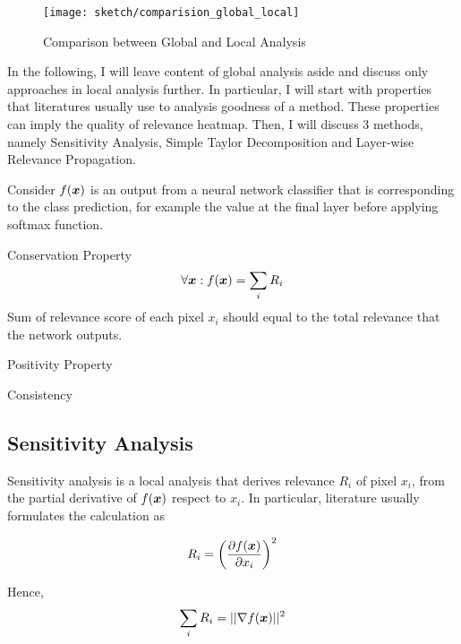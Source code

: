  \begin{figure}[!hbt]
\centering
\texttt{[image: sketch/comparision\_global\_local]}
\caption{Comparison between Global and Local Analysis}
\label{fig:comparision_between_global_and_local_analysis}
\end{figure}

In the following, I will leave content of global analysis aside and discuss  only approaches in local analysis further.  In particular, I will start with properties that literatures usually use to analysis goodness of a method. These properties can imply the quality of relevance heatmap. Then, I will discuss  3 methods, namely Sensitivity Analysis,  Simple Taylor Decomposition and Layer-wise Relevance Propagation.

Consider $f(\patvector{x})$ is an output from a neural network classifier that is corresponding to the class prediction, for example the value at the final layer before applying softmax function.
\begin{definition} Conservation Property
\begin{align*}
	\forall \patvector{x} : f(\patvector{x}) = \sum_i R_i
\end{align*}
Sum of relevance score of each pixel $x_i$ should equal to the total relevance that the network outputs.

\end{definition}
\begin{definition} Positivity Property
\end{definition}
\begin{definition} Consistency
\end{definition}

\subsection{Sensitivity Analysis}
Sensitivity analysis\cite{SimonyanDeepConvolutionalNetworks2013} is a local analysis that derives relevance $R_i$ of pixel $x_i$, from the partial derivative of $f(\patvector{x})$ respect to $x_i$. In particular, literature usually formulates the calculation as 

\begin{align*}
	R_i =
	 \bigg( \frac{\partial f(\patvector{x})}{ \partial x_i } \bigg)^2
\end{align*}

Hence, 
\begin{align*}
	\sum_i R_i = || \nabla f(\patvector{x}) ||^2
\end{align*}

